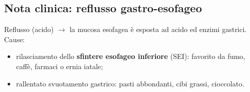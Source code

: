 \subsection{Nota clinica: reflusso gastro-esofageo}
Reflusso (acido) $\rightarrow$ la mucosa esofagea è esposta ad acido ed enzimi gastrici. Cause:
\begin{itemize}
  \item rilasciamento dello \textbf{sfintere esofageo inferiore} (SEI): favorito da fumo, caffè,
    farmaci o ernia iatale;
  \item rallentato svuotamento gastrico: pasti abbondanti, cibi grassi, cioccolato.
\end{itemize}
